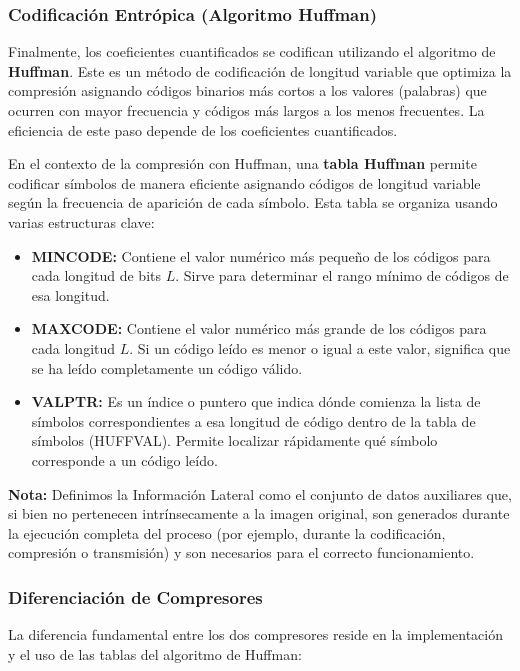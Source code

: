 \documentclass[a4paper, 12pt]{article}
\begin{document}
\subsubsection{Codificación Entrópica (Algoritmo Huffman)}
Finalmente, los coeficientes cuantificados se codifican utilizando el algoritmo de \textbf{Huffman}. Este es un método de codificación de longitud variable que optimiza la compresión asignando códigos binarios más cortos a los valores (palabras) que ocurren con mayor frecuencia y códigos más largos a los menos frecuentes. La eficiencia de este paso depende de los coeficientes cuantificados.

En el contexto de la compresión con Huffman, una \textbf{tabla Huffman} permite codificar símbolos de manera eficiente asignando códigos de longitud variable según la frecuencia de aparición de cada símbolo. Esta tabla se organiza usando varias estructuras clave:

\begin{itemize}
    \item \textbf{MINCODE:} Contiene el valor numérico más pequeño de los códigos para cada longitud de bits $L$. Sirve para determinar el rango mínimo de códigos de esa longitud.
    
    \item \textbf{MAXCODE:} Contiene el valor numérico más grande de los códigos para cada longitud $L$. Si un código leído es menor o igual a este valor, significa que se ha leído completamente un código válido.
    
    \item \textbf{VALPTR:} Es un índice o puntero que indica dónde comienza la lista de símbolos correspondientes a esa longitud de código dentro de la tabla de símbolos (HUFFVAL). Permite localizar rápidamente qué símbolo corresponde a un código leído.
\end{itemize}


\textbf{Nota:} Definimos la Información Lateral como el conjunto de datos auxiliares que, si bien no pertenecen intrínsecamente a la imagen original, son generados durante la ejecución completa del proceso (por ejemplo, durante la codificación, compresión o transmisión) y son necesarios para el correcto funcionamiento. 
 
\subsubsection{Diferenciación de Compresores}

La diferencia fundamental entre los dos compresores reside en la implementación y el uso de las tablas del algoritmo de Huffman:
\end{document}

